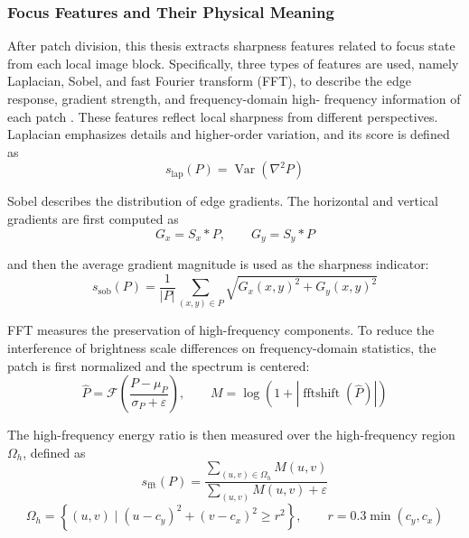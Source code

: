 \subsubsection{Focus Features and Their Physical Meaning}
\par After patch division, this thesis extracts sharpness features related to
focus state from each local image block. Specifically, three types of features
are used, namely Laplacian, Sobel, and fast Fourier transform (FFT), to
describe the edge response, gradient strength, and frequency-domain high-
frequency information of each patch \cite{5739529,1284395}. These features
reflect local sharpness from different perspectives. Laplacian emphasizes
details and higher-order variation, and its score is defined as
\begin{equation}
    s_{\mathrm{lap}}(P)=\operatorname{Var}\!\left(\nabla^2 P\right)
    \label{eq:lap-score}
\end{equation}
\par Sobel describes the distribution of edge gradients. The horizontal and
vertical gradients are first computed as
\begin{equation}
    G_x=S_x * P,\qquad G_y=S_y * P
    \label{eq:sobel-grad}
\end{equation}
\par and then the average gradient magnitude is used as the sharpness
indicator:
\begin{equation}
    s_{\mathrm{sob}}(P)=\frac{1}{|P|}\sum_{(x,y)\in P}\sqrt{G_x(x,y)^2+G_y(x,y)^2}
    \label{eq:sobel-score}
\end{equation}
\par FFT measures the preservation of high-frequency components. To reduce the
interference of brightness scale differences on frequency-domain statistics,
the patch is first normalized and the spectrum is centered:
\begin{equation}
    \hat{P}=\mathcal{F}\!\left(\frac{P-\mu_P}{\sigma_P+\varepsilon}\right),\qquad
    M=\log\!\left(1+\left|\operatorname{fftshift}(\hat{P})\right|\right)
    \label{eq:fft-prepare}
\end{equation}
\par The high-frequency energy ratio is then measured over the high-frequency
region $\Omega_h$, defined as
\begin{equation}
    s_{\mathrm{fft}}(P)=
    \frac{\sum_{(u,v)\in \Omega_h} M(u,v)}
    {\sum_{(u,v)} M(u,v)+\varepsilon}
    \label{eq:fft-score}
\end{equation}
\begin{equation}
    \Omega_h=\left\{(u,v)\mid (u-c_y)^2+(v-c_x)^2\ge r^2\right\},\qquad
    r=0.3\min(c_y,c_x)
    \label{eq:fft-mask}
\end{equation}
